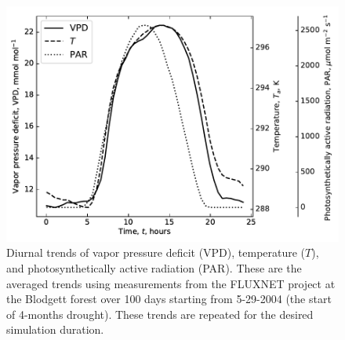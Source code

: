 \documentclass[utf8]{frontiersSCNS} %
\begin{document}
\begin{figure}[h]
    \begin{center}
         \includegraphics[scale=0.75]{environment.pdf}   
    \end{center}
    \caption{Diurnal trends of vapor pressure deficit (VPD), temperature ($T$), and photosynthetically active radiation (PAR). These are the averaged trends using measurements from the FLUXNET project at the Blodgett forest over 100 days starting from 5-29-2004 (the start of 4-months drought). These trends are repeated for the desired simulation duration.}
    \label{fig:environment}
\end{figure}
\end{document}
